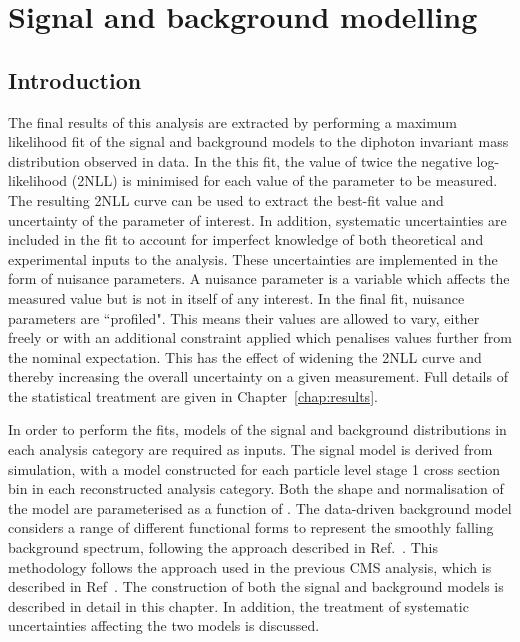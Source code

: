 \chapter{Signal and background modelling}
\label{chap:sigbkg}

\section{Introduction}

The final results of this analysis are extracted by performing a maximum likelihood fit 
of the signal and background models to the diphoton invariant mass distribution observed in data.
In the this fit, the value of twice the negative log-likelihood (2NLL) is minimised 
for each value of the parameter to be measured.
The resulting 2NLL curve can be used to extract the best-fit value and uncertainty 
of the parameter of interest.
In addition, systematic uncertainties are included in the fit to account for 
imperfect knowledge of both theoretical and experimental inputs to the analysis.
These uncertainties are implemented in the form of nuisance parameters.
A nuisance parameter is a variable which affects the measured value 
but is not in itself of any interest.
In the final fit, nuisance parameters are ``profiled".
This means their values are allowed to vary, 
either freely or with an additional constraint applied 
which penalises values further from the nominal expectation.
This has the effect of widening the 2NLL curve and thereby increasing the overall uncertainty
on a given measurement.
Full details of the statistical treatment are given in Chapter~\ref{chap:results}.

In order to perform the fits, models of the signal and background \mgg distributions 
in each analysis category are required as inputs.
The signal model is derived from simulation, 
with a model constructed for each particle level stage 1 cross section bin 
in each reconstructed analysis category.
Both the shape and normalisation of the model are parameterised as a function of \mH.
The data-driven background model considers a range of different functional forms to 
represent the smoothly falling background spectrum, 
following the approach described in Ref.~\cite{Envelope}.
This methodology follows the approach used in the previous CMS \Hgg analysis, 
which is described in Ref~\cite{HIG-16-040}.
The construction of both the signal and background models is described in detail in this chapter.
In addition, the treatment of systematic uncertainties affecting the two models is discussed.

